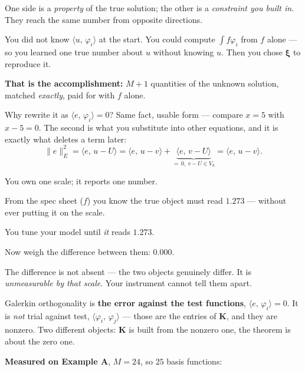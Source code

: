 \documentclass[11pt]{article}
\newcommand{\ip}[2]{\bigl\langle #1,\,#2\bigr\rangle}
\newcommand{\norm}[1]{\lVert #1\rVert}
\newcommand{\Vh}{V_{h}}
\newcommand{\Kmat}{\bm{K}}
\begin{document}
\begin{pts}
\item One side is a \emph{property} of the true solution; the other is a
      \emph{constraint you built in}. They reach the same number from opposite
      directions.
\item You did not know $\ip{u}{\varphi_i}$ at the start. You could compute
      $\int f\varphi_i$ from $f$ alone --- so you learned one true number about
      $u$ without knowing $u$. Then you chose $\bm{\xi}$ to reproduce it.
\item \textbf{That is the accomplishment:} $M+1$ quantities of the unknown
      solution, matched \emph{exactly}, paid for with $f$ alone.
\item Why rewrite it as $\ip{e}{\varphi_i}=0$? Same fact, usable form ---
      compare $x=5$ with $x-5=0$. The second is what you substitute into other
      equations, and it is exactly what deletes a term later:
      \[
        \norm{e}_E^{2}=\ip{e}{u-U}=\ip{e}{u-v}
          +\underbrace{\ip{e}{v-U}}_{=\,0,\ v-U\in\Vh}=\ip{e}{u-v}.
      \]
\end{pts}

\begin{intuition}
You own one scale; it reports one number.
\begin{pts}
\item From the spec sheet ($f$) you know the true object must read $1.273$ ---
      without ever putting it on the scale.
\item You tune your model until \emph{it} reads $1.273$.
\item Now weigh the difference between them: $\mathbf{0.000}$.
\end{pts}
The difference is not absent --- the two objects genuinely differ. It is
\emph{unmeasurable by that scale}. Your instrument cannot tell them apart.
\end{intuition}

\begin{pitfall}
Galerkin orthogonality is \textbf{the error against the test functions},
$\ip{e}{\varphi_i}=0$. It is \emph{not} trial against test,
$\ip{\varphi_i}{\varphi_j}$ --- those are the entries of $\Kmat$, and they are
nonzero. Two different objects: $\Kmat$ is built from the nonzero one, the
theorem is about the zero one.
\end{pitfall}

\textbf{Measured on Example A}, $M=24$, so $25$ basis functions:
\end{document}
